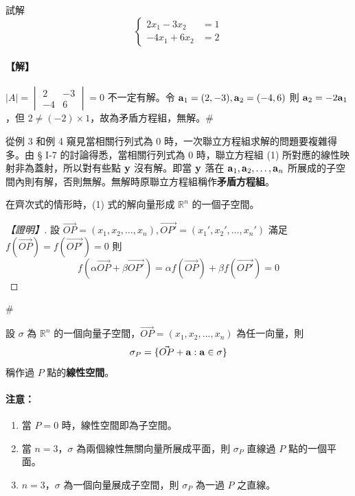 \begin{example}\label{ex:b6s-1-44}
試解
\[ \left\{\begin{aligned}
2x_1 - 3x_2 &= 1 \\
-4x_1 + 6x_2 &= 2
\end{aligned}\right. \]
\end{example}

\paragraph{【解】}
$|A| = \begin{vmatrix} 2 & -3 \\ -4 & 6 \end{vmatrix} = 0$ 不一定有解。令 $\boldsymbol{\mathbf{a}}_1=(2, -3), \boldsymbol{\mathbf{a}}_2=(-4, 6)$ 則 $\boldsymbol{\mathbf{a}}_2 = -2\boldsymbol{\mathbf{a}}_1$，但 $2 \ne (-2) \times 1$，故為矛盾方程組，無解。\hfill$\#$

從例 3 和例 4 窺見當相關行列式為 0 時，一次聯立方程組求解的問題要複雜得多。由 § I-7 的討論得悉，當相關行列式為 0 時，聯立方程組 (1) 所對應的線性映射非為蓋射，所以對有些點 $\boldsymbol{\mathbf{y}}$ 沒有解。即當 $\boldsymbol{\mathbf{y}}$ 落在 $\boldsymbol{\mathbf{a}}_1, \boldsymbol{\mathbf{a}}_2, \dots, \boldsymbol{\mathbf{a}}_n$ 所展成的子空間內則有解，否則無解。無解時原聯立方程組稱作\textbf{矛盾方程組}。

\begin{discussion}[*]\label{disc:b6s-1-6}
在齊次式的情形時，(1) 式的解向量形成 $\mathbb{R}^n$ 的一個子空間。
\end{discussion}

\begin{proof}[【證明】]
設 $\vec{OP}=(x_1, x_2, \dots, x_n), \vec{OP'}=(x_1', x_2', \dots, x_n')$ 滿足 $f(\vec{OP}) = f(\vec{OP'}) = 0$ 則
\[ f(\alpha\vec{OP} + \beta\vec{OP'}) = \alpha f(\vec{OP}) + \beta f(\vec{OP'}) = 0 \]
\end{proof}\hfill$\#$

\begin{definition*}[*]\label{def:b6s-1-affine}
設 $\sigma$ 為 $\mathbb{R}^n$ 的一個向量子空間，$\vec{OP}=(x_1, x_2, \dots, x_n)$ 為任一向量，則
\begin{equation}
\sigma_P = \{ \vec{OP} + \boldsymbol{\mathbf{a}} : \boldsymbol{\mathbf{a}} \in \sigma \} \label{eq:b6s-1-8-4}
\end{equation}
稱作過 $P$ 點的\textbf{線性空間}。
\end{definition*}

\paragraph{注意：}
\begin{enumerate}[label=\arabic*., leftmargin=2em]
  \item 當 $P=0$ 時，線性空間即為子空間。
  \item 當 $n=3$，$\sigma$ 為兩個線性無關向量所展成平面，則 $\sigma_P$ 直線過 $P$ 點的一個平面。
  \item $n=3$，$\sigma$ 為一個向量展成子空間，則 $\sigma_P$ 為一過 $P$ 之直線。
\end{enumerate}

